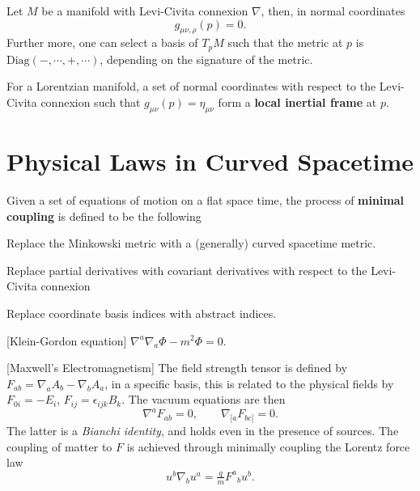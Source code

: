 \documentclass[12pt]{article}
\begin{document}
\begin{lemma}
	Let $M$ be a manifold with Levi-Civita connexion $\nabla$, then, in normal coordinates
		\begin{equation}
			g_{\mu\nu,\rho}(p) = 0.
		\end{equation}
	Further more, one can select a basis of $T_pM$ such that the metric at $p$ is $\text{Diag}(-, \cdots, +, \cdots)$, depending on the signature of the metric.
\end{lemma}
\begin{definition}
	For a Lorentzian manifold, a set of normal coordinates with respect to the Levi-Civita connexion such that $g_{\mu\nu}(p) = \eta_{\mu\nu}$ form a {\textbf{local inertial frame} at $p$}.
\end{definition}

\section{Physical Laws in Curved Spacetime}

\begin{definition}
	Given a set of equations of motion on a flat space time, the process of \textbf{minimal coupling} is defined to be the following
		\begin{ronumerate}
			\item Replace the Minkowski metric with a (generally) curved spacetime metric.
			\item Replace partial derivatives with covariant derivatives with respect to the Levi-Civita connexion
			\item Replace coordinate basis indices with abstract indices.
		\end{ronumerate}
\end{definition}

\begin{example}
	\begin{ronumerate}
		\item {[Klein-Gordon equation]} $\nabla^a \nabla_a \Phi - m^2 \Phi = 0.$
		\item {[Maxwell's Electromagnetism]} The field strength tensor is defined by $F_{ab} = \nabla_a A_b - \nabla_b A_a$, in a specific basis, this is related to the physical fields by $F_{0i} = - E_i$, $F_{ij} = \epsilon_{ijk} B_k$. The vacuum equations are then
			\begin{equation}
				\nabla^a F_{ab} = 0, \qquad \nabla_{[a} F_{bc]} = 0.
			\end{equation}
		The latter is a \textit{Bianchi identity}, and holds even in the presence of sources. The coupling of matter to $F$ is achieved through minimally coupling the Lorentz force law
			\begin{equation}
				u^b \nabla_b u^a = \tfrac{q}{m} {F^a}_b u^b.
			\end{equation}
	\end{ronumerate}
\end{example}
\end{document}
